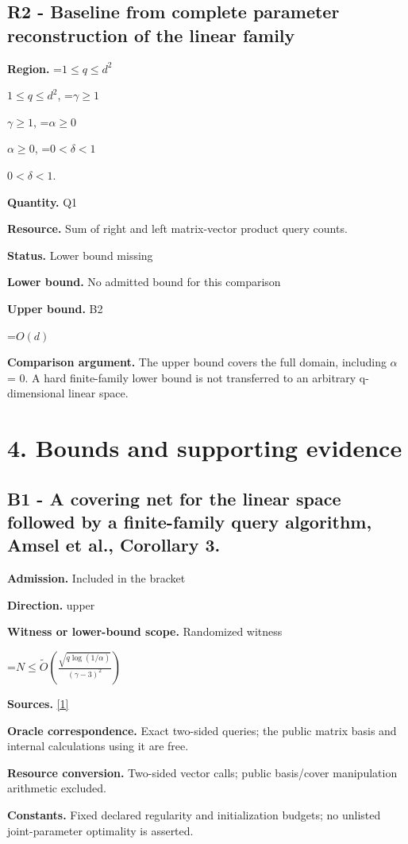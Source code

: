 \documentclass[10pt,a4paper]{article}
\newcommand{\AtlasMath}[1]{\par\begingroup\centering\setbox0=\hbox{$\displaystyle #1$}\ifdim\wd0>1.4\linewidth\typeout{ATLAS WIDE FORMULA: \the\wd0}\fi\ifdim\wd0>\linewidth\resizebox{\linewidth}{!}{\box0}\else\box0\fi\par\endgroup}
\newcommand{\AtlasInlineMath}[1]{\begingroup\setbox0=\hbox{$#1$}\ifdim\wd0>.4\linewidth\endgroup\AtlasMath{#1}\else\endgroup$#1$\fi}
\begin{document}
\subsection{R2 - Baseline from complete parameter reconstruction of the linear family}
\textbf{Region.} \AtlasInlineMath{1\le q\le d^2}, \AtlasInlineMath{\gamma\ge1}, \AtlasInlineMath{\alpha\ge0}, \AtlasInlineMath{0<\delta<1}.

\textbf{Quantity.} Q1

\textbf{Resource.} Sum of right and left matrix-vector product query counts.

\textbf{Status.} Lower bound missing

\textbf{Lower bound.} No admitted bound for this comparison

\textbf{Upper bound.} B2

\AtlasMath{O(d)}
\textbf{Comparison argument.} The upper bound covers the full domain, including $\alpha$ = 0. A hard finite-family lower bound is not transferred to an arbitrary q-dimensional linear space.

\section{4. Bounds and supporting evidence}
\subsection{B1 - A covering net for the linear space followed by a finite-family query algorithm, Amsel et al., Corollary 3.}
\textbf{Admission.} Included in the bracket

\textbf{Direction.} upper

\textbf{Witness or lower-bound scope.} Randomized witness

\AtlasMath{N\le\widetilde{O}\!\left(\frac{\sqrt{q\log(1/\alpha)}}{(\gamma-3)^2}\right)}
\textbf{Sources.} \href{https://raw.githubusercontent.com/mlresearch/v336/main/assets/amsel26a/amsel26a.pdf}{[1]}

\textbf{Oracle correspondence.} Exact two-sided queries; the public matrix basis and internal calculations using it are free.

\textbf{Resource conversion.} Two-sided vector calls; public basis/cover manipulation arithmetic excluded.

\textbf{Constants.} Fixed declared regularity and initialization budgets; no unlisted joint-parameter optimality is asserted.
\end{document}
